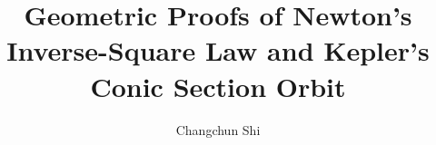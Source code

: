 \title{Geometric Proofs of Newton's Inverse-Square Law and Kepler's Conic Section Orbit}
\author{Changchun Shi}
\date{}

\maketitle
